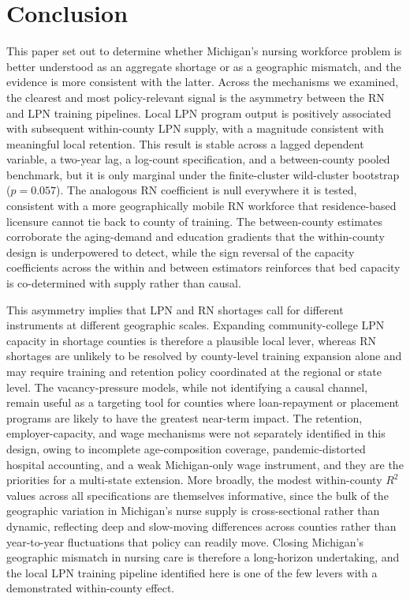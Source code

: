 \documentclass[12pt]{article}
\begin{document}
\section{Conclusion}\label{sec:conclusion}

This paper set out to determine whether Michigan's nursing workforce
problem is better understood as an aggregate shortage or as a geographic
mismatch, and the evidence is more consistent with the latter. Across the mechanisms
we examined, the clearest and most policy-relevant signal is the asymmetry
between the RN and LPN training pipelines. Local LPN program output is
positively associated with subsequent within-county LPN supply, with a
magnitude consistent with meaningful local retention. This result is stable
across a lagged dependent variable, a two-year lag, a log-count
specification, and a between-county pooled benchmark, but it is only
marginal under the finite-cluster wild-cluster bootstrap ($p = 0.057$). The analogous RN coefficient is null everywhere it is tested,
consistent with a more geographically mobile RN workforce that
residence-based licensure cannot tie back to county of training. The
between-county estimates corroborate the aging-demand and education
gradients that the within-county design is underpowered to detect, while
the sign reversal of the capacity coefficients across the within and
between estimators reinforces that bed capacity is co-determined with supply
rather than causal.

This asymmetry implies that LPN and RN shortages call for different
instruments at different geographic scales. Expanding community-college LPN
capacity in shortage counties is therefore a plausible local lever, whereas
RN shortages are unlikely to be resolved by county-level training expansion
alone and may require training and retention policy coordinated at the
regional or state level. The vacancy-pressure models,
while not identifying a causal channel, remain useful as a targeting tool
for counties where loan-repayment or placement programs are likely to have
the greatest near-term impact. The retention, employer-capacity, and wage
mechanisms were not separately identified in this design, owing to
incomplete age-composition coverage, pandemic-distorted hospital
accounting, and a weak Michigan-only wage instrument, and they are the
priorities for a multi-state extension. More broadly, the modest
within-county $R^2$ values across all specifications are themselves
informative, since the bulk of the geographic variation in Michigan's nurse
supply is cross-sectional rather than dynamic, reflecting deep and
slow-moving differences across counties rather than year-to-year
fluctuations that policy can readily move. Closing Michigan's geographic
mismatch in nursing care is therefore a long-horizon undertaking, and the
local LPN training pipeline identified here is one of the few levers with a
demonstrated within-county effect.


\newpage


\end{document}
